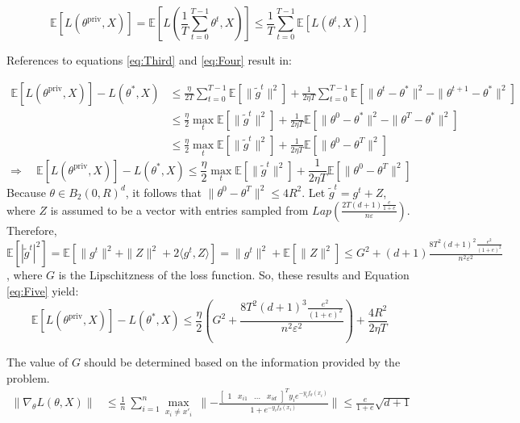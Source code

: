 \documentclass[12pt]{extarticle}
\begin{document}
\begin{equation}
	\mathbb{E}[L(\theta^\text{priv}, X)] = \mathbb{E}[L(\frac{1}{T} \sum_{t=0}^{T-1} \theta^t, X)] \le \frac{1}{T} \sum_{t=0}^{T-1}\mathbb{E}[L(\theta^t, X)] \label{eq:Four}
\end{equation}

References to equations \ref{eq:Third} and \ref{eq:Four} result in:

\begin{align*}
	\mathbb{E}[L(\theta^\text{priv}, X)] -  L(\theta^{*}, X) &\leq \frac{\eta}{2T}\sum_{t=0}^{T-1}\mathbb{E}[\|\tilde{g}^{t}\|^2] + \frac{1}{2\eta T}\sum_{t=0}^{T-1}\mathbb{E} [\|\theta^{t} - \theta^{*}\|^2 - \|\theta^{t+1} - \theta^{*}\|^2]\\
	&\leq \frac{\eta}{2}\max_t \mathbb{E}[\|\tilde{g}^{t}\|^2] + \frac{1}{2\eta T}\mathbb{E} [\|\theta^{0}- \theta^{*}\|^2 - \|\theta^{T}- \theta^{*}\|^2]\\
	&\leq \frac{\eta}{2}\max_t \mathbb{E}[\|\tilde{g}^{t}\|^2] + \frac{1}{2\eta T}\mathbb{E} [\|\theta^{0}-\theta^{T}\|^2]
\end{align*}
\begin{equation}
	\Rightarrow\quad \mathbb{E}[L(\theta^\text{priv}, X)] -  L(\theta^{*}, X) \leq \frac{\eta}{2}\max_t \mathbb{E}[\|\tilde{g}^{t}\|^2] + \frac{1}{2\eta T}\mathbb{E} [\|\theta^{0}-\theta^{T}\|^2]\label{eq:Five}
\end{equation}
Because $\theta \in B_2(0, R)^d$, it follows that $\|\theta^{0}-\theta^{T}\|^2 \le 4R^2$. Let $\tilde{g}^{t} = {g}^{t} + Z$, where $Z$ is assumed to be a vector with entries sampled from $Lap\left(\frac{2T(d+1)\frac{e}{1+e}}{n\varepsilon}\right)$. Therefore, $\mathbb{E}[|\tilde{g}^{t}|^2] = \mathbb{E}[\|g^{t}\|^2 + \|Z\|^2 + 2\langle g^{t},Z\rangle] = \|g^{t}\|^2 + \mathbb{E}[\|Z\|^2] \le G^2 + (d+1)\frac{8T^2(d+1)^2 \frac{e^2}{(1+e)^2}}{n^2\varepsilon^2}$, where $G$ is the Lipschitzness of the loss function. So, these results and Equation \ref{eq:Five} yield:
\begin{equation}
	\mathbb{E}[L(\theta^\text{priv}, X)] -  L(\theta^{*}, X) \leq \frac{\eta}{2}( G^2 + \frac{8T^2(d+1)^3 \frac{e^2}{(1+e)^2}}{n^2\varepsilon^2}) + \frac{4R^2}{2\eta T}\label{eq:Six}
\end{equation}

The value of \(G\) should be determined based on the information provided by the problem.
\begin{align*}
	\|\nabla_\theta  L(\theta,X)\| 
	&\le \frac{1}{n}\ \sum_{i=1}^{n} \underset{x_i \neq x'_i}{\max}\ \lVert -\frac{\begin{bmatrix}
			1 & x_{i1} & \dots & x_{id}
		\end{bmatrix}^T y_i e^{-y_i f_\theta(x_i)}}{1+e^{-y_i f_\theta(x_i)}} \| \le \frac{e}{1+e} \sqrt{d+1} \\
\end{align*}
\end{document}
